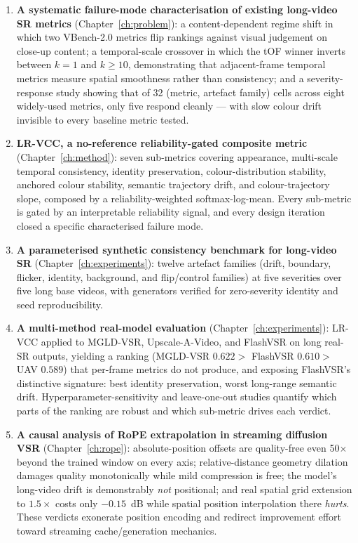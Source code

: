 \begin{enumerate}
    \item \textbf{A systematic failure-mode characterisation of existing long-video SR
          metrics} (Chapter~\ref{ch:problem}): a content-dependent regime shift in which
          two VBench-2.0 metrics flip rankings against visual judgement on close-up
          content; a temporal-scale crossover in which the tOF winner inverts between
          $k{=}1$ and $k{\geq}10$, demonstrating that adjacent-frame temporal metrics
          measure spatial smoothness rather than consistency; and a severity-response
          study showing that of 32 (metric, artefact family) cells across eight
          widely-used metrics, only five respond cleanly --- with slow colour drift
          invisible to every baseline metric tested.
    \item \textbf{LR-VCC, a no-reference reliability-gated composite metric}
          (Chapter~\ref{ch:method}): seven sub-metrics covering appearance, multi-scale
          temporal consistency, identity preservation, colour-distribution stability,
          anchored colour stability, semantic trajectory drift, and colour-trajectory
          slope, composed by a reliability-weighted softmax-log-mean. Every sub-metric is
          gated by an interpretable reliability signal, and every design iteration closed
          a specific characterised failure mode.
    \item \textbf{A parameterised synthetic consistency benchmark for long-video SR}
          (Chapter~\ref{ch:experiments}): twelve artefact families (drift, boundary,
          flicker, identity, background, and flip/control families) at five severities
          over five long base videos, with generators verified for zero-severity identity
          and seed reproducibility.
    \item \textbf{A multi-method real-model evaluation} (Chapter~\ref{ch:experiments}):
          LR-VCC applied to MGLD-VSR, Upscale-A-Video, and FlashVSR on long real-SR
          outputs, yielding a ranking (MGLD-VSR $0.622 >$ FlashVSR $0.610 >$ UAV
          $0.589$) that per-frame metrics do not produce, and exposing FlashVSR's
          distinctive signature: best identity preservation, worst long-range semantic
          drift. Hyperparameter-sensitivity and leave-one-out studies quantify which
          parts of the ranking are robust and which sub-metric drives each verdict.
    \item \textbf{A causal analysis of RoPE extrapolation in streaming diffusion VSR}
          (Chapter~\ref{ch:rope}): absolute-position offsets are quality-free even
          50$\times$ beyond the trained window on every axis; relative-distance geometry
          dilation damages quality monotonically while mild compression is free; the
          model's long-video drift is demonstrably \emph{not} positional; and real spatial
          grid extension to $1.5\times$ costs only $-0.15$~dB while spatial position
          interpolation there \emph{hurts}. These verdicts exonerate position encoding and
          redirect improvement effort toward streaming cache/generation mechanics.
\end{enumerate}

